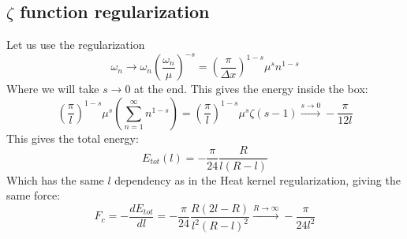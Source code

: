 \documentclass{article}
\begin{document}
\subsection{$\zeta$ function regularization}
Let us use the regularization
\begin{equation}
    \omega_n \rightarrow \omega_n \left(\frac{\omega_n}{\mu}\right)^{-s} = \left(\frac{\pi}{\Delta x}\right)^{1 - s}\mu^{s} n^{1 - s}
\end{equation}
Where we will take $s \rightarrow 0$ at the end. This gives the energy inside the box:
\begin{equation}
    \left(\frac{\pi}{l}\right)^{1 - s}\mu^{s}\left(\sum_{n=1}^\infty n^{1 - s}\right) = \left(\frac{\pi}{l}\right)^{1 - s}\mu^{s} \zeta(s - 1) \xrightarrow{s \rightarrow 0} -\frac{\pi}{12l}
\end{equation}
This gives the total energy:
\begin{equation}
    E_{tot}(l) = - \frac{\pi}{24}\frac{R}{l(R - l)}
\end{equation}
Which has the same $l$ dependency as in the Heat kernel regularization, giving the same force:
\begin{equation}
    F_c = -\frac{dE_{tot}}{dl} = - \frac{\pi}{24}\frac{R(2l - R)}{l^2(R - l)^2} \xrightarrow {R\rightarrow\infty} -\frac{\pi}{24l^2}
\end{equation}
\end{document}
